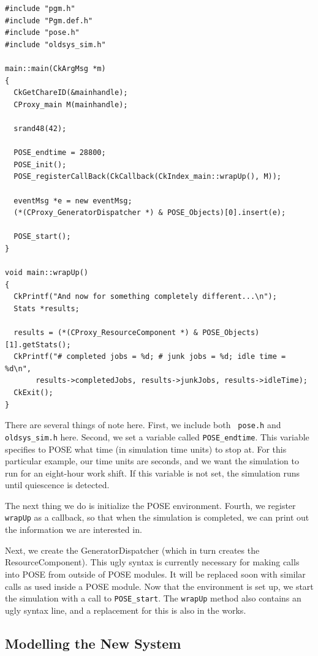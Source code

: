 \documentclass[10pt]{article}
\begin{document}
\begin{verbatim}
#include "pgm.h"
#include "Pgm.def.h"
#include "pose.h"
#include "oldsys_sim.h"

main::main(CkArgMsg *m)
{ 
  CkGetChareID(&mainhandle);
  CProxy_main M(mainhandle);

  srand48(42);

  POSE_endtime = 28800;
  POSE_init();
  POSE_registerCallBack(CkCallback(CkIndex_main::wrapUp(), M));

  eventMsg *e = new eventMsg;
  (*(CProxy_GeneratorDispatcher *) & POSE_Objects)[0].insert(e);

  POSE_start();
}

void main::wrapUp()
{
  CkPrintf("And now for something completely different...\n");
  Stats *results;

  results = (*(CProxy_ResourceComponent *) & POSE_Objects)[1].getStats();
  CkPrintf("# completed jobs = %d; # junk jobs = %d; idle time = %d\n", 
	   results->completedJobs, results->junkJobs, results->idleTime);  
  CkExit();
}
\end{verbatim}

There are several things of note here. First, we include both {\tt
pose.h} and {\tt oldsys\_sim.h} here.  Second, we set a variable called
{\tt POSE\_endtime}.  This variable specifies to POSE what time (in
simulation time units) to stop at.  For this particular example, our
time units are seconds, and we want the simulation to run for an
eight-hour work shift.  If this variable is not set, the simulation
runs until quiescence is detected.

The next thing we do is initialize the POSE environment.  Fourth, we
register {\tt wrapUp} as a callback, so that when the simulation is
completed, we can print out the information we are interested in.  

Next, we create the GeneratorDispatcher (which in turn creates the
ResourceComponent).  This ugly syntax is currently necessary for
making calls into POSE from outside of POSE modules.  It will be
replaced soon with similar calls as used inside a POSE module.  Now
that the environment is set up, we start the simulation with a call to
{\tt POSE\_start}.  The {\tt wrapUp} method also contains an ugly
syntax line, and a replacement for this is also in the works.

\subsection{Modelling the New System}
\end{document}
